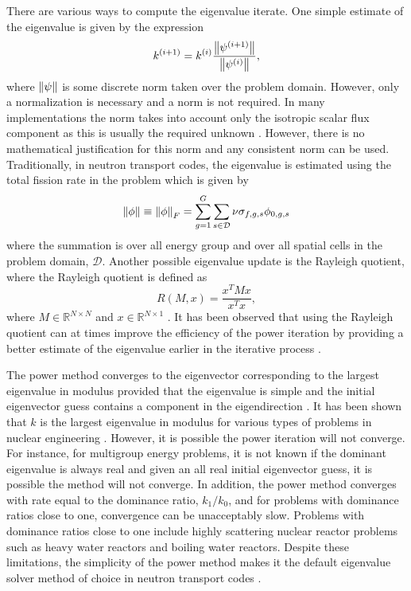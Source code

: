 There are various ways to compute the eigenvalue iterate. One simple estimate of the eigenvalue is given by the expression
\begin{equation}
k^{(i+1)} = k^{(i)} \frac{ \left\lVert\psi^{(i+1)}\right\rVert}{\left\lVert\psi^{(i)}\right\rVert},
\end{equation}
where $\left\lVert\psi\right\rVert$ is some discrete norm taken over the problem domain. However, only a normalization is necessary and a norm is not required. In many implementations the norm takes into account only the isotropic scalar flux component as this is usually the required unknown \cite{warsa2004krylov}. However, there is no mathematical justification for this norm and any consistent norm can be used. Traditionally, in neutron transport codes, the eigenvalue is estimated using the total fission rate in the problem \cite{warsa2004krylov} which is given by 
\begin{equation}
	\left\lVert\phi\right\rVert \equiv \left\lVert\phi\right\rVert_{F} = \sum_{g=1}^{G} \sum_{s \in \mathcal{D}} \nu \sigma_{f,g,s} \phi_{0,g,s}
\end{equation}
where the summation is over all energy group and over all spatial cells in the problem domain, $\mathcal{D}$. Another possible eigenvalue update is the Rayleigh quotient, where the Rayleigh quotient is defined as
\begin{equation}
	R(M,x) = \frac{x^{T}Mx}{x^{T}x},
\end{equation}
where $M \in \mathbb{R}^{N \times N}$ and $x \in \mathbb{R}^{N \times 1}$ \cite{horn_matrix_2012}. It has been observed that using the Rayleigh quotient can at times improve the efficiency of the power iteration by providing a better estimate of the eigenvalue earlier in the iterative process \cite{warsa2004krylov}.

The power method converges to the eigenvector corresponding to the largest eigenvalue in modulus provided that the eigenvalue is simple and the initial eigenvector guess contains a component in the eigendirection \cite{golub_matrix_2012}. It has been shown that $k$ is the largest eigenvalue in modulus for various types of problems in nuclear engineering \cite{modak_evaluation_1995}. However, it is possible the power iteration will not converge. For instance, for multigroup energy problems, it is not known if the dominant eigenvalue is always real and given an all real initial eigenvector guess, it is possible the method will not converge. In addition, the power method converges with rate equal to the dominance ratio, $k_{1}/k_{0}$, and for problems with dominance ratios close to one, convergence can be unacceptably slow. Problems with dominance ratios close to one include highly scattering nuclear reactor problems such as heavy water reactors and boiling water reactors. Despite these limitations, the simplicity of the power method makes it the default eigenvalue solver method of choice in neutron transport codes \cite{duderstadt_nuclear_1976}.

